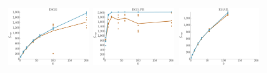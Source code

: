 \documentclass[a4paper]{report}
\newcommand{\wratio}{0.16}
\begin{document}
\vfill
\includegraphics[width=\wratio\textwidth]{maxcut/DIGG/fs_digg}\hfill
\includegraphics[width=\wratio\textwidth]{maxcut/EGO_FB/fs_ego_fb}\hfill
\includegraphics[width=\wratio\textwidth]{maxcut/EMAIL/fs_email}\hfill
\end{document}
